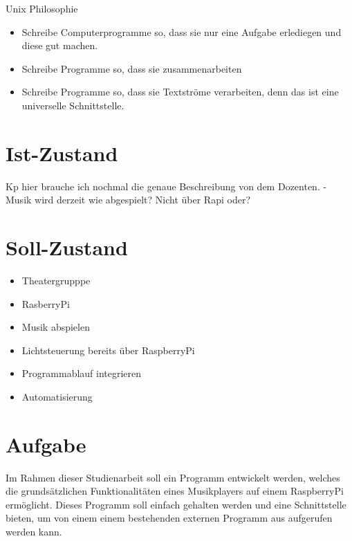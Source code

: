 Unix Philosophie
\begin{itemize}
\item Schreibe Computerprogramme so, dass sie nur eine Aufgabe erlediegen und
diese gut machen.
\item Schreibe Programme so, dass sie zusammenarbeiten
\item Schreibe Programme so, dass sie Textströme verarbeiten, denn das ist eine
universelle Schnittstelle.
\end{itemize}


\section{Ist-Zustand}
Kp hier brauche ich nochmal die genaue Beschreibung von dem Dozenten. \newline
- Musik wird derzeit wie abgespielt? Nicht über Rapi oder?

\section{Soll-Zustand}
\begin{itemize}
\item Theatergrupppe
\item RasberryPi
\item Musik abspielen
\item Lichtsteuerung bereits über RaspberryPi
\item Programmablauf integrieren
\item Automatisierung
\end{itemize}

\section{Aufgabe}
Im Rahmen dieser Studienarbeit soll ein Programm entwickelt werden, welches
die grundsätzlichen Funktionalitäten eines Musikplayers auf einem RaspberryPi
ermöglicht. Dieses Programm soll einfach gehalten werden und eine Schnittstelle
bieten, um von einem einem bestehenden externen Programm aus aufgerufen werden
kann. 
